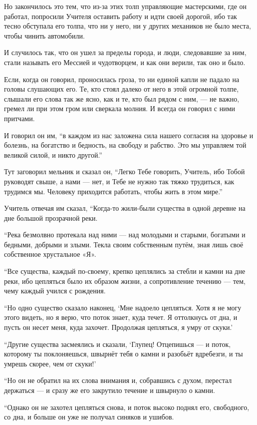 Но закончилось это тем, что из-за этих толп управляющие мастерскими, где он работал, попросили Учителя оставить работу и идти своей дорогой, ибо так тесно обступала его толпа, что ни у него, ни у других механиков не было места, чтобы чинить автомобили.

И случилось так, что он ушел за пределы города, и люди, следовавшие за ним, стали называть его Мессией и чудотворцем, и как они верили, так оно и было.

Если, когда он говорил, проносилась гроза, то ни единой капли не падало на головы слушающих его. Те, кто стоял далеко от него в этой огромной толпе, слышали его слова так же ясно, как и те, кто был рядом с ним, --- не важно, гремел ли при этом гром или сверкала молния. И всегда он говорил с ними притчами.

И говорил он им, ``в каждом из нас заложена сила нашего согласия на здоровье и болезнь, на богатство и бедность, на свободу и рабство. Это мы управляем той великой силой, и никто другой.''

Тут заговорил мельник и сказал он, ``Легко Тебе говорить, Учитель, ибо Тобой руководят свыше, а нами --- нет, и Тебе не нужно так тяжко трудиться, как трудимся мы. Человеку приходится работать, чтобы жить в этом мире.''

Учитель отвечая им сказал, ``Когда-то жили-были существа в одной деревне на дне большой прозрачной реки.

``Река безмолвно протекала над ними --- над молодыми и старыми, богатыми и бедными, добрыми и злыми.
 Текла своим собственным путём, зная лишь своё собственное хрустальное «Я».

``Все существа, каждый по-своему, крепко цеплялись за стебли и камни на дне реки, ибо цепляться было их образом жизни, а сопротивление течению --- тем, чему каждый учился с рождения.

``Но одно существо сказало наконец, `Мне надоело цепляться. Хотя я не могу этого видеть, но я верю, что поток знает, куда течет. Я оттолкнусь от дна, и пусть он несет меня, куда захочет. Продолжая цепляться, я умру от скуки.'

``Другие существа засмеялись и сказали, `Глупец! Отцепишься --- и поток, которому ты поклоняешься, швырнёт тебя о камни и разобьёт вдребезги, и ты умрешь скорее, чем от скуки!'

``Но он не обратил на их слова внимания и, собравшись с духом, перестал держаться --- и сразу же его закрутило течение и швырнуло о камни.

``Однако он не захотел цепляться снова, и поток высоко поднял его, свободного, со дна, и больше он уже не получал синяков и ушибов.

